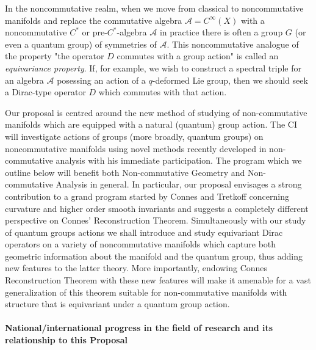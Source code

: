 \documentclass[12pt]{article}
\begin{document}
In the noncommutative realm, when we move from classical to noncommutative manifolds and replace the commutative algebra $\mathcal{A}=C^{\infty}(X)$ with a noncommutative $C^*$ or pre-$C^*$-algebra $\mathcal{A}$ in practice there is often a group $G$ (or even a quantum group) of symmetries of $\mathcal{A}.$ This noncommutative analogue of the property "the operator $D$ commutes with a group action" is called an {\it equivariance property}. If, for example, we wish to construct a spectral triple for an algebra $\mathcal{A}$ posessing an action of a $q$-deformed Lie group, then we should seek a Dirac-type operator $D$ which commutes with that action.



Our proposal is centred around the new method of studying of non-commutative manifolds which are equipped with a natural (quantum) group action. The CI will investigate actions of groups (more broadly, quantum groups) on noncommutative manifolds using novel methods recently developed in non-commutative analysis with his immediate participation. The program which we outline below will benefit both Non-commutative Geometry and Non-commutative Analysis in general. In particular, our proposal envisages a strong contribution to a grand program started by Connes and Tretkoff \cite{ConnesTretkoff} concerning curvature and higher order smooth invariants and suggests a completely different perspective on Connes' Reconstruction Theorem. Simultaneously with our study of quantum groups actions we shall introduce and study equivariant Dirac operators on a variety of noncommutative manifolds which capture both geometric information about the manifold and the quantum group, thus adding new features to the latter theory. More importantly, endowing Connes Reconstruction Theorem with these new features will make it amenable for a vast generalization of this theorem suitable for non-commutative manifolds with structure that is equivariant under a quantum group action.


\paragraph*{National/international progress in the field of research and its relationship to this Proposal}
\end{document}
